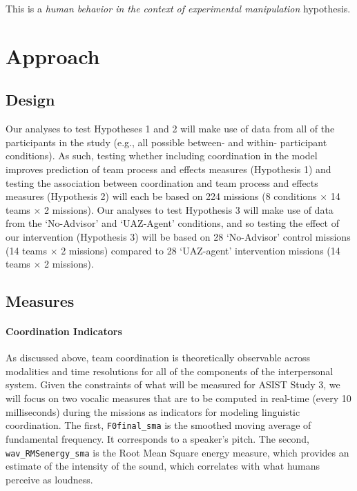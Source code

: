 \noindent This is a
\textit{human behavior in the context of experimental manipulation} hypothesis.

\section{Approach}

\subsection{Design}

Our analyses to test Hypotheses 1 and 2 will make use of data from all of the
participants in the study (e.g., all possible between- and within- participant
conditions). As such, testing whether including coordination in the model
improves prediction of team process and effects measures (Hypothesis 1) and
testing the association between coordination and team process and effects
measures (Hypothesis 2) will each be based on 224 missions (8 conditions
$\times$ 14 teams $\times$ 2 missions). Our analyses to test Hypothesis 3 will
make use of data from the `No-Advisor' and `UAZ-Agent' conditions, and so
testing the effect of our intervention (Hypothesis 3) will be based on 28
`No-Advisor' control missions (14 teams $\times$ 2 missions) compared to 28
`UAZ-agent' intervention missions (14 teams $\times$ 2 missions).

\subsection{Measures}
\label{subsec:measures}

\paragraph{Coordination Indicators} As discussed above, team coordination is
theoretically observable across modalities and time resolutions for all of the
components of the interpersonal system. Given the constraints of what will be
measured for ASIST Study 3, we will focus on two vocalic measures that are to
be computed in real-time (every 10 milliseconds) during the missions as
indicators for modeling linguistic coordination. The first,
\texttt{F0final\_sma} is the smoothed moving average of fundamental frequency.
It corresponds to a speaker’s pitch.  The second, \texttt{wav\_RMSenergy\_sma}
is the Root Mean Square energy measure, which provides an estimate of the
intensity of the sound, which correlates with what humans perceive as loudness. 

